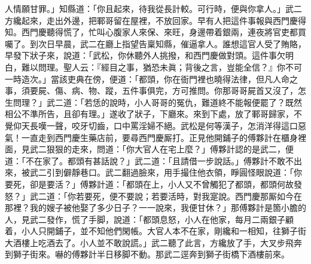 人情願甘罪。」知縣道：「你且起來，待我從長計較。{}可行時，便與你拿人。」武二方纔起來，走出外邊，把鄆哥留在屋裡，不放回家。{}早有人把這件事報與西門慶得知。西門慶聽得慌了，忙叫心腹家人來保、來旺，{}身邊帶着銀兩，連夜將官吏都買囑了。到次日早晨，武二在廳上指望告稟知縣，催逼拿人。誰想這官人受了賄賂，早發下狀子來，說道：「武松，你休聽外人挑撥，和西門慶做對頭。這件事欠明白，難以問理。聖人云：『經目之事，猶恐未眞；背後之言，豈能全信？』你不可一時造次。」當該吏典在傍，便道：「都頭，你在衙門裡也曉得法律，但凡人命之事，須要屍、傷、病、物、蹤，五件事俱完，方可推問。你那哥哥屍首又沒了，怎生問理？」{}武二道：「若恁的說時，小人哥哥的冤仇，難道終不能報便罷了？既然相公不準所告，且卻有理。」遂收了狀子，下廳來。來到下處，放了鄆哥歸家，不覺仰天長嘆一聲，咬牙切齒，口中罵淫婦不絕。武松是何等漢子，怎消洋得這口惡氣！一直走到西門慶生藥店前，要尋西門慶厮打。正見他開鋪子的傅夥計在櫃身裡面，見武二狠狠的走來，問道：「你大官人在宅上麼？」傅夥計認的是武二，便道：「不在家了。都頭有甚話說？」武二道：「且請借一步說話。」傅夥計不敢不出來，被武二引到僻靜巷口。武二翻過臉來，用手撮住他衣領，睜圓怪眼說道：「你要死，卻是要活？」{}傅夥計道：「都頭在上，小人又不曾觸犯了都頭，都頭何故發怒？」武二道：「你若要死，便不要說；若要活時，對我寔說。西門慶那厮如今在那裡？我的嫂子被他娶了多少日子？一一說來，我便甘休？」那傅夥計是箇小膽的人，見武二發作，慌了手脚，說道：「都頭息怒，小人在他家，每月二兩銀子顧着，小人只開鋪子，並不知他們閑帳。大官人本不在家，剛纔和一相知，往獅子街大酒樓上吃酒去了。小人並不敢說謊。」{}武二聽了此言，方纔放了手，大叉步飛奔到獅子街來。嚇的傅夥計半日移脚不動。那武二逕奔到獅子街橋下酒樓前來。

